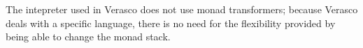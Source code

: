 The intepreter used in Verasco does not use monad transformers; because Verasco
deals with a specific language, there is no need for the flexibility provided
by being able to change the monad stack.

